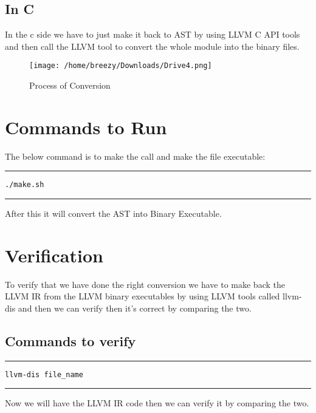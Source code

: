 \documentclass[openany]{book}
\begin{document}
\subsection{In C}
In the c side we have to just make it back to AST by using LLVM C API tools and then call  the LLVM tool to convert the whole module into the binary files.\newline

\begin{figure}[h]
	\texttt{[image: /home/breezy/Downloads/Drive4.png]}
	\caption{Process of Conversion}
	\label{fig:4.1}
\end{figure} \newpage

\section{Commands to Run}
The below command is to make the call and make the file executable: \newline
\noindent\rule{12cm}{0.4pt}

\begin{verbatim}
./make.sh
\end{verbatim}
\noindent\rule{12cm}{0.4pt}\newline \newline


After this it will convert the AST into Binary Executable.\newline \newline

\section{Verification}
To verify that we have done the right conversion we have to make back the LLVM IR from the LLVM binary executables by using LLVM tools called llvm-dis and then we can verify then it's correct by comparing the two.

\subsection{Commands to verify}
\noindent\rule{12cm}{0.4pt}

\begin{verbatim}
llvm-dis file_name
\end{verbatim}

\noindent\rule{12cm}{0.4pt}\newline

Now we will have the LLVM IR code then we can verify it by comparing the two.
\end{document}

